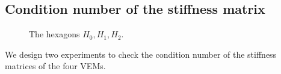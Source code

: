 \documentclass[10pt]{amsart}
\numberwithin{equation}{section}
\begin{document}
\subsection{Condition number of the stiffness
matrix}
\begin{figure}[htbp]
\centering
{}
\caption{The hexagons $H_0, H_1, H_2$.}
  \label{fig:collapsehexagon} %
\end{figure} 
We design two experiments to check the condition number of the stiffness
matrices of the four VEMs. 
\end{document}
